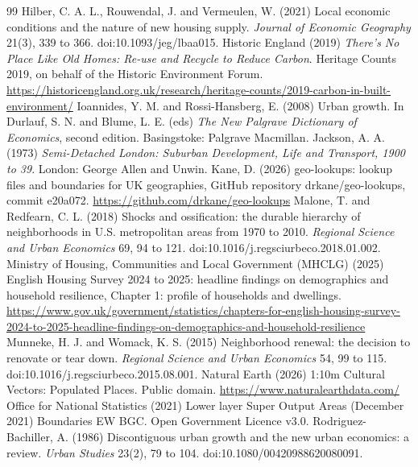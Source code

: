 \begin{thebibliography}{99}
 Hilber, C. A. L., Rouwendal, J. and Vermeulen, W. (2021) Local economic conditions and the nature of new housing supply. \textit{Journal of Economic Geography} 21(3), 339 to 366. doi:10.1093/jeg/lbaa015.
 Historic England (2019) \textit{There's No Place Like Old Homes: Re-use and Recycle to Reduce Carbon}. Heritage Counts 2019, on behalf of the Historic Environment Forum. \url{https://historicengland.org.uk/research/heritage-counts/2019-carbon-in-built-environment/}
 Ioannides, Y. M. and Rossi-Hansberg, E. (2008) Urban growth. In Durlauf, S. N. and Blume, L. E. (eds) \textit{The New Palgrave Dictionary of Economics}, second edition. Basingstoke: Palgrave Macmillan.
 Jackson, A. A. (1973) \textit{Semi-Detached London: Suburban Development, Life and Transport, 1900 to 39}. London: George Allen and Unwin.
 Kane, D. (2026) geo-lookups: lookup files and boundaries for UK geographies, GitHub repository drkane/geo-lookups, commit e20a072. \url{https://github.com/drkane/geo-lookups}
 Malone, T. and Redfearn, C. L. (2018) Shocks and ossification: the durable hierarchy of neighborhoods in U.S. metropolitan areas from 1970 to 2010. \textit{Regional Science and Urban Economics} 69, 94 to 121. doi:10.1016/j.regsciurbeco.2018.01.002.
 Ministry of Housing, Communities and Local Government (MHCLG) (2025) English Housing Survey 2024 to 2025: headline findings on demographics and household resilience, Chapter 1: profile of households and dwellings. \url{https://www.gov.uk/government/statistics/chapters-for-english-housing-survey-2024-to-2025-headline-findings-on-demographics-and-household-resilience}
 Munneke, H. J. and Womack, K. S. (2015) Neighborhood renewal: the decision to renovate or tear down. \textit{Regional Science and Urban Economics} 54, 99 to 115. doi:10.1016/j.regsciurbeco.2015.08.001.
 Natural Earth (2026) 1:10m Cultural Vectors: Populated Places. Public domain. \url{https://www.naturalearthdata.com/}
 Office for National Statistics (2021) Lower layer Super Output Areas (December 2021) Boundaries EW BGC. Open Government Licence v3.0.
 Rodriguez-Bachiller, A. (1986) Discontiguous urban growth and the new urban economics: a review. \textit{Urban Studies} 23(2), 79 to 104. doi:10.1080/00420988620080091.

\end{thebibliography}
